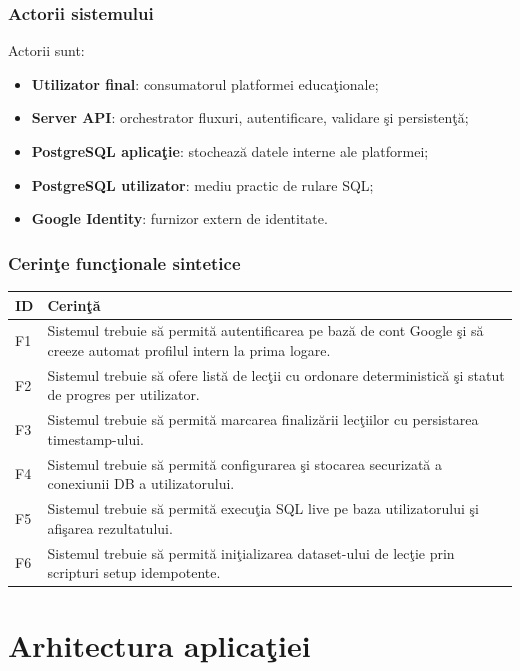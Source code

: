 \documentclass[12pt,onecolumn,draftclsnofoot]{IEEEtran}
\begin{document}
\subsubsection{Actorii sistemului}
Actorii sunt:
\begin{itemize}
  \item \textbf{Utilizator final}: consumatorul platformei educa\c{t}ionale;
  \item \textbf{Server API}: orchestrator fluxuri, autentificare, validare \c{s}i persisten\c{t}\u{a};
  \item \textbf{PostgreSQL aplica\c{t}ie}: stocheaz\u{a} datele interne ale platformei;
  \item \textbf{PostgreSQL utilizator}: mediu practic de rulare SQL;
  \item \textbf{Google Identity}: furnizor extern de identitate.
\end{itemize}

\subsubsection{Cerin\c{t}e func\c{t}ionale sintetice}
\begin{longtable}{p{} p{}}
\toprule
\textbf{ID} & \textbf{Cerin\c{t}\u{a}} \\
\midrule
F1 & Sistemul trebuie s\u{a} permit\u{a} autentificarea pe baz\u{a} de cont Google \c{s}i s\u{a} creeze automat profilul intern la prima logare. \\
F2 & Sistemul trebuie s\u{a} ofere list\u{a} de lec\c{t}ii cu ordonare deterministic\u{a} \c{s}i statut de progres per utilizator. \\
F3 & Sistemul trebuie s\u{a} permit\u{a} marcarea finaliz\u{a}rii lec\c{t}iilor cu persistarea timestamp-ului. \\
F4 & Sistemul trebuie s\u{a} permit\u{a} configurarea \c{s}i stocarea securizat\u{a} a conexiunii DB a utilizatorului. \\
F5 & Sistemul trebuie s\u{a} permit\u{a} execu\c{t}ia SQL live pe baza utilizatorului \c{s}i afi\c{s}area rezultatului. \\
F6 & Sistemul trebuie s\u{a} permit\u{a} ini\c{t}ializarea dataset-ului de lec\c{t}ie prin scripturi setup idempotente. \\
\bottomrule
\end{longtable}

\section{Arhitectura aplica\c{t}iei}
\end{document}
